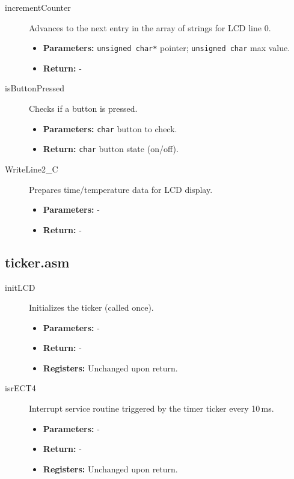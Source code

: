 \documentclass[a4paper,12pt]{article}
\begin{document}
\begin{description}
    \item[incrementCounter] Advances to the next entry in the array of strings for LCD line 0.
    \begin{itemize}
        \item \textbf{Parameters:} \texttt{unsigned char*} pointer; \texttt{unsigned char} max value.
        \item \textbf{Return:} -
    \end{itemize}
    
    \item[isButtonPressed] Checks if a button is pressed.
    \begin{itemize}
        \item \textbf{Parameters:} \texttt{char} button to check.
        \item \textbf{Return:} \texttt{char} button state (on/off).
    \end{itemize}
    
    \item[WriteLine2\_C] Prepares time/temperature data for LCD display.
    \begin{itemize}
        \item \textbf{Parameters:} -
        \item \textbf{Return:} -
    \end{itemize}
\end{description}

\subsection{ticker.asm}

\begin{description}
    \item[initLCD] Initializes the ticker (called once).
    \begin{itemize}
        \item \textbf{Parameters:} -
        \item \textbf{Return:} -
        \item \textbf{Registers:} Unchanged upon return.
    \end{itemize}
    
    \item[isrECT4] Interrupt service routine triggered by the timer ticker every 10\,ms.
    \begin{itemize}
        \item \textbf{Parameters:} -
        \item \textbf{Return:} -
        \item \textbf{Registers:} Unchanged upon return.
    \end{itemize}
\end{description}
\end{document}
